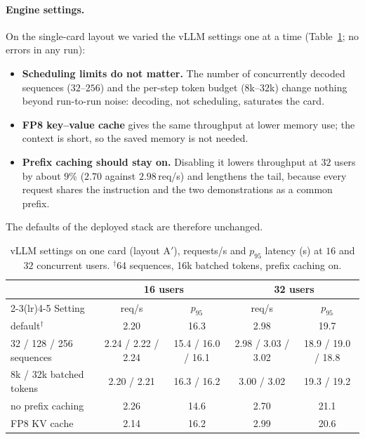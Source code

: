 \documentclass[11pt,a4paper]{article}
\begin{document}
\paragraph{Engine settings.} On the single-card layout we varied the vLLM settings one at a time (Table~\ref{tab:flags}; no errors in any run):
\begin{itemize}[leftmargin=*]
\item \textbf{Scheduling limits do not matter.} The number of concurrently decoded sequences ($32$--$256$) and the per-step token budget ($8$k--$32$k) change nothing beyond run-to-run noise: decoding, not scheduling, saturates the card.
\item \textbf{FP8 key--value cache} gives the same throughput at lower memory use; the context is short, so the saved memory is not needed.
\item \textbf{Prefix caching should stay on.} Disabling it lowers throughput at $32$ users by about $9\%$ ($2.70$ against $2.98$\,req/s) and lengthens the tail, because every request shares the instruction and the two demonstrations as a common prefix.
\end{itemize}
The defaults of the deployed stack are therefore unchanged.
\begin{table}[H]
\centering
\caption{vLLM settings on one card (layout A$'$), requests/s and $p_{95}$ latency (s) at $16$ and $32$ concurrent users. $^\dagger$64 sequences, 16k batched tokens, prefix caching on.}\label{tab:flags}
\small\setlength{\tabcolsep}{4pt}
\begin{tabular}{@{}lcccc@{}}
\toprule
 & \multicolumn{2}{c}{16 users} & \multicolumn{2}{c}{32 users}\\
\cmidrule(lr){2-3}\cmidrule(lr){4-5}
Setting & req/s & $p_{95}$ & req/s & $p_{95}$\\
\midrule
default$^\dagger$ & 2.20 & 16.3 & 2.98 & 19.7\\
32 / 128 / 256 sequences & 2.24 / 2.22 / 2.24 & 15.4 / 16.0 / 16.1 & 2.98 / 3.03 / 3.02 & 18.9 / 19.0 / 18.8\\
8k / 32k batched tokens & 2.20 / 2.21 & 16.3 / 16.2 & 3.00 / 3.02 & 19.3 / 19.2\\
no prefix caching & 2.26 & 14.6 & 2.70 & 21.1\\
FP8 KV cache & 2.14 & 16.2 & 2.99 & 20.6\\
\bottomrule
\end{tabular}
\end{table}
\end{document}

